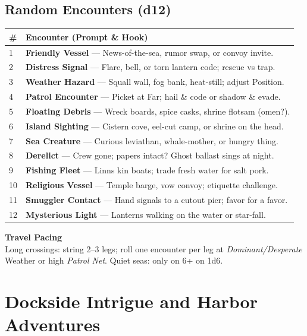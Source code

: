 \documentclass[11pt,oneside]{book}
\begin{document}
\begin{itemize}
\subsection*{Random Encounters (d12)}
\begin{tabularx}{\linewidth}{@{}p{0.7cm} X@{}}
\toprule
\# & \textbf{Encounter (Prompt \& Hook)}\\
\midrule
1 & \textbf{Friendly Vessel} --- News-of-the-sea, rumor swap, or convoy invite.\\
2 & \textbf{Distress Signal} --- Flare, bell, or torn lantern code; rescue vs trap.\\
3 & \textbf{Weather Hazard} --- Squall wall, fog bank, heat-still; adjust Position.\\
4 & \textbf{Patrol Encounter} --- Picket at Far; hail \& code or shadow \& evade.\\
5 & \textbf{Floating Debris} --- Wreck boards, spice casks, shrine flotsam (omen?).\\
6 & \textbf{Island Sighting} --- Cistern cove, eel-cut camp, or shrine on the head.\\
7 & \textbf{Sea Creature} --- Curious leviathan, whale-mother, or hungry thing.\\
8 & \textbf{Derelict} --- Crew gone; papers intact? Ghost ballast sings at night.\\
9 & \textbf{Fishing Fleet} --- Linns kin boats; trade fresh water for salt pork.\\
10 & \textbf{Religious Vessel} --- Temple barge, vow convoy; etiquette challenge.\\
11 & \textbf{Smuggler Contact} --- Hand signals to a cutout pier; favor for a favor.\\
12 & \textbf{Mysterious Light} --- Lanterns walking on the water or star-fall.\\
\bottomrule
\end{tabularx}

\begin{tcolorbox}[breakable]
\textbf{Travel Pacing}\\
Long crossings: string 2--3 legs; roll one encounter per leg at \emph{Dominant/Desperate} Weather or high \emph{Patrol Net}. Quiet seas: only on 6+ on 1d6.
\end{tcolorbox}

\section{Dockside Intrigue and Harbor Adventures}


\end{itemize}
\end{document}

